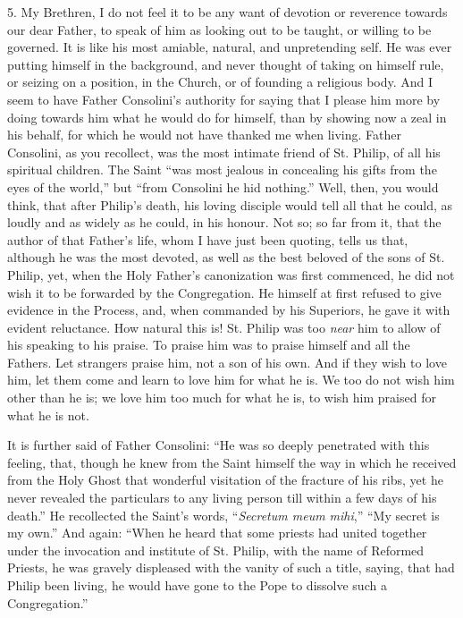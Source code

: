 5. My Brethren, I do not feel it to be any want of
devotion or reverence towards our dear Father, to speak
of him as looking out to be taught, or willing to be
governed. It is like his most amiable, natural, and
unpretending self. He was ever putting himself in the
background, and never thought of taking on himself rule,
or seizing on a position, in the Church, or of founding a
religious body. And I seem to have Father Consolini's
authority for saying that I please him more by doing
towards him what he would do for himself, than by showing
now a zeal in his behalf, for which he would not have
thanked me when living. Father Consolini, as you
recollect, was the most intimate friend of St. Philip, of
all his spiritual children. The Saint ``was most
jealous in concealing his gifts from the eyes of the
world,'' but ``from Consolini he hid
nothing.'' Well, then, you would think, that after
Philip's death, his loving disciple would tell all that
he could, as loudly and as widely as he could, in his
honour. Not so; so far from it, that the author of that
Father's life, whom I have just been quoting, tells us
that, although he was the most devoted, as well as the
best beloved of the sons of St. Philip, yet, when the
Holy Father's canonization was first commenced, he did
not wish it to be forwarded by the Congregation. He
himself at first refused to give evidence in the Process,
and, when commanded by his Superiors, he gave it with
evident reluctance. How natural this is! St. Philip was
too \emph{near} him to allow of his speaking to his
praise. To praise him was to praise himself and all the
Fathers. Let strangers praise him, not a son of his own.
And if they wish to love him, let them come and learn to
love him for what he is. We too do not wish him other
than he is; we love him too much for what he is, to wish
him praised for what he is not.

It is further said of Father Consolini: ``He was
so deeply penetrated with this feeling, that, though he
knew from the Saint himself the way in which he received
from the Holy Ghost that wonderful visitation of the
fracture of his ribs, yet he never revealed the
particulars to any living person till within a few days
of his death.'' He recollected the Saint's words,
``\emph{Secretum meum mihi},'' ``My secret is
my own.'' And again: ``When he heard that some priests had united together under the invocation and
institute of St. Philip, with the name of Reformed
Priests, he was gravely displeased with the vanity of
such a title, saying, that had Philip been living, he
would have gone to the Pope to dissolve such a
Congregation.''

